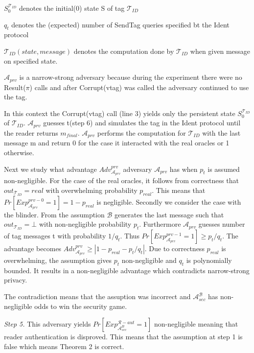     $S_0^{\mathcal{T}_{ID}}$ denotes the initial(0) state S of tag $\mathcal{T}_{ID}$

    $q_t$ denotes the (expected) number of SendTag queries specified bt the Ident protocol

    $\mathcal{T}_{ID}(state, message)$ denotes the computation done by $\mathcal{T}_{ID}$ 
    when given message on specified state. 
    
    $\mathcal{A}_{prv}$ is a narrow-strong adversary because during the experiment there were no Result($\pi$) calls and after Corrupt(vtag) was called 
    the adversary continued to use the tag.

    In this context the Corrupt(vtag) call (line 3) yields only the persistent state $S_0^{\mathcal{T}_{ID}}$ of 
    $\mathcal{T}_{ID}$. $\mathcal{A}_{prv}$ guesses t(step 6) and simulates the tag in the Ident protocol until 
    the reader returns $m_{final}$. $\mathcal{A}_{prv}$ performs the computation for $\mathcal{T}_{ID}$ with the last
    message m and return 0 for the case it interacted with the real oracles or 1 otherwise.

    Next we study what advantage $Adv_{\mathcal{A}_{prv}}^{prv}$ adversary $\mathcal{A}_{prv}$ has when $p_t$ is assumed non-negligible.
    For the case of the real oracles, it follows from correctness that $out_{\mathcal{T}_{ID}} = real$ with overwhelming
    probability $p_{real}$. This means that $Pr[Exp_{\mathcal{A}_{prv}}^{prv-0} = 1] = 1-p_{real}$ is negligible. Secondly we consider the case
    with the blinder. From the assumption $\mathcal{B}$ generates the last message such that $out_{\mathcal{T}_{ID}} = \bot$ with 
    non-negligible probability $p_t$. Furthermore $\mathcal{A}_{prv}$ guesses number of tag messages t with 
    probability $1/q_t$. Thus $Pr[Exp_{\mathcal{A}_{prv}}^{prv-1} = 1] \ge p_t/q_t$. The advantage becomes
    $Adv_{\mathcal{A}_{prv}}^{prv} \ge |1-p_{real}-p_t/q_t|$. Due to correctness $p_{real}$ is overwhelming, the 
    assumption gives $p_t$ non-negligible and $q_t$ is polynomially bounded. It results in a non-negligible 
    advantage which contradicts narrow-strong privacy.

    The contradiction means that the assuption was incorrect and $\mathcal{A}_{sec}^{\mathcal{B}}$ has non-negligible odds to win the security game.

    \textit{Step 5.} This adversary yields $Pr[Exp_{\mathcal{A}_{sec}^{B}}^{\mathcal{R}-aut} = 1]$ non-negligible meaning that reader authentication is disproved. 
    This means that the assumption at step 1 is false which means Theorem 2 is correct. 


